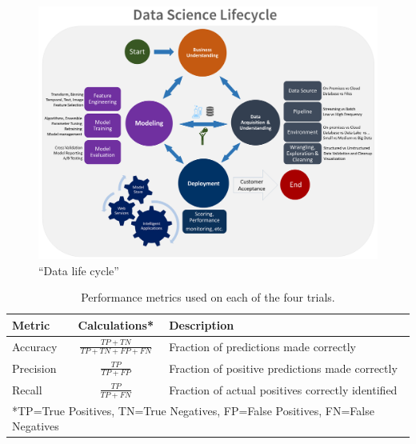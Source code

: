\documentclass[11pt,letterpaper]{article}
\begin{document}
\begin{figure}[h!]
  \centering
    \includegraphics[width=0.9\linewidth]{../img/TDSP_Data_Science_Lifecycle.png}
    \caption{``Data life cycle'' \citep{tdsp:2024}}
    \label{fig:tdsp}
  \end{figure}

  \begin{table}[hb!]
    \setlength\extrarowheight{1em}
    \begin{center}
        \begin{tabular}{l c l}
            \hline 
            Metric & Calculations* & Description \\
            \hline
            Accuracy & $\frac{TP + TN}{TP + TN + FP + FN}$ & Fraction of predictions made correctly \\
            Precision & $\frac{TP}{TP+FP}$ & Fraction of positive predictions made correctly \\
            Recall & $\frac{TP}{TP+FN}$ & Fraction of actual positives correctly identified \\
            \hline
            \multicolumn{3}{l}{*TP=True Positives, TN=True Negatives, FP=False Positives, FN=False Negatives} \\
            \hline
        \end{tabular}
        \caption{Performance metrics used on each of the four trials.}
        \label{table:metrics}
    \end{center}
\end{table}

\clearpage



\clearpage

\section*{}

\setcounter{page}{29}


\center{}
\end{document}
